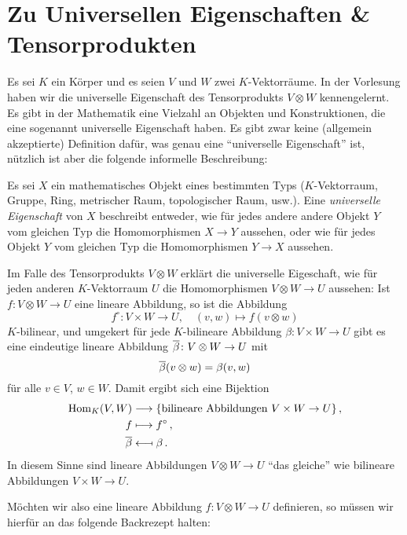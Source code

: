 \section*{Zu Universellen Eigenschaften \& Tensorprodukten}

Es sei $K$ ein Körper und es seien $V$ und $W$ zwei $K$-Vektorräume.
In der Vorlesung haben wir die universelle Eigenschaft des Tensorprodukts $V \otimes W$ kennengelernt.
Es gibt in der Mathematik eine Vielzahl an Objekten und Konstruktionen, die eine sogenannt universelle Eigenschaft haben.
Es gibt zwar keine (allgemein akzeptierte) Definition dafür, was genau eine \enquote{universelle Eigenschaft} ist, nützlich ist aber die folgende informelle Beschreibung:
 
\begin{idea}
  \label{idea: universal properties}
  Es sei $X$ ein mathematisches Objekt eines bestimmten Typs ($K$-Vektorraum, Gruppe, Ring, metrischer Raum, topologischer Raum, usw.).
  Eine \emph{universelle Eigenschaft} von $X$ beschreibt entweder, wie für jedes andere andere Objekt $Y$ vom gleichen Typ die Homomorphismen $X \to Y$ aussehen, oder wie für jedes Objekt $Y$ vom gleichen Typ die Homomorphismen $Y \to X$ aussehen.
\end{idea}

Im Falle des Tensorprodukts $V \otimes W$ erklärt die universelle Eigeschaft, wie für jeden anderen $K$-Vektorraum $U$ die Homomorphismen $V \otimes W \to U$ aussehen:
Ist $f \colon V \otimes W \to U$ eine lineare Abbildung, so ist die Abbildung
\[
          f^\circ
  \colon  V \times W
  \to     U,
  \quad   (v,w)
  \mapsto f(v \otimes w)
\]
$K$-bilinear, und umgekert für jede $K$-bilineare Abbildung $\beta \colon V \times W \to U$ gibt es eine eindeutige lineare Abbildung $\overline{\beta} \colon V \otimes W \to U$ mit
\[
    \overline{\beta}(v \otimes w)
  = \beta(v,w)
\]
für alle $v \in V$, $w \in W$.
Damit ergibt sich eine Bijektion
\begin{align*}
                    \operatorname{Hom}_K(V,W)
  &\longrightarrow  \{ \text{bilineare Abbildungen $V \times W \to U$} \} \,,
  \\
                    f
  &\longmapsto      f^\circ \,,
  \\
                    \overline{\beta}
  &\longmapsfrom    \beta \,.
\end{align*}
In diesem Sinne sind lineare Abbildungen $V \otimes W \to U$ \enquote{das gleiche} wie bilineare Abbildungen $V \times W \to U$.

Möchten wir also eine lineare Abbildung $f \colon V \otimes W \to U$ definieren, so müssen wir hierfür an das folgende Backrezept halten:

